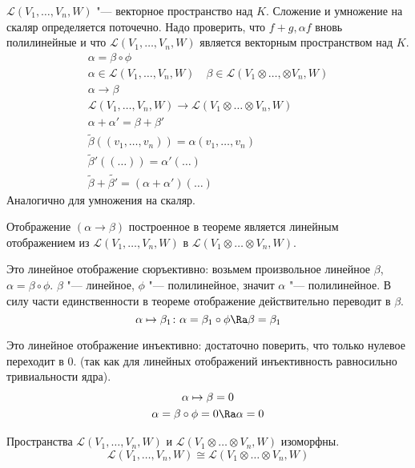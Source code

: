 \begin{description}
	$\mathcal L(V_1, \dots, V_n, W)$ "--- векторное пространство над $K$.
	Сложение и умножение на скаляр определяется поточечно.
	Надо проверить, что $f+g, \alpha f$ вновь полилинейные и
	что $\mathcal L(V_1, \dots, V_n, W)$ является векторным пространством над $K$.
	\begin{gather*}
		\alpha = \beta \circ \phi \\
		\alpha \in \mathcal L(V_1, \dots, V_n, W) \quad
		\beta \in \mathcal L(V_1 \otimes \dots,\otimes V_n, W) \\
		\alpha \to \beta \\
		\mathcal L(V_1, \dots, V_n, W) \to \mathcal L(V_1 \otimes \dots \otimes V_n, W) \\
		\alpha + \alpha' = \beta + \beta' \\
		\tilde \beta((v_1, \dots, v_n)) = \alpha(v_1, \dots, v_n) \\
		\tilde \beta'((\dots)) = \alpha'(\dots) \\
		\tilde \beta + \tilde{\beta'} = (\alpha + \alpha')(\dots)
	\end{gather*}
	Аналогично для умножения на скаляр.

	Отображение $(\alpha \to \beta)$ построенное в теореме является линейным отображением из
	$\mathcal L(V_1, \dots, V_n, W)$  в $\mathcal L(V_1 \otimes \dots \otimes V_n, W)$.

	Это линейное отображение сюръективно:
	возьмем произвольное линейное $\beta$, $\alpha = \beta \circ \phi$.
	$\beta$ "--- линейное, $\phi$ "--- полилинейное, значит $\alpha$ "--- полилинейное.
	В силу части единственности в теореме отображение действительно переводит в $\beta$.
	\[ \alpha \mapsto \beta_1 \colon \alpha = \beta_1 \circ \phi \Ra \beta = \beta_1 \]

	Это линейное отображение инъективно:
	достаточно поверить, что только нулевое переходит в 0.
	(так как для линейных отображений инъективность равносильно тривиальности ядра).
	\begin{gather*}
		\alpha \mapsto \beta = 0 \\
		\alpha = \beta \circ \phi = 0 \Ra \alpha = 0
	\end{gather*}

	\begin{conseq}
		Пространства $\mathcal L(V_1, \dots, V_n, W)$ и $\mathcal L(V_1 \otimes \dots \otimes V_n, W)$ изоморфны.
		\[ \mathcal L(V_1, \dots, V_n, W) \cong \mathcal L(V_1 \otimes \dots \otimes V_n, W) \]
	\end{conseq}
\end{description}

